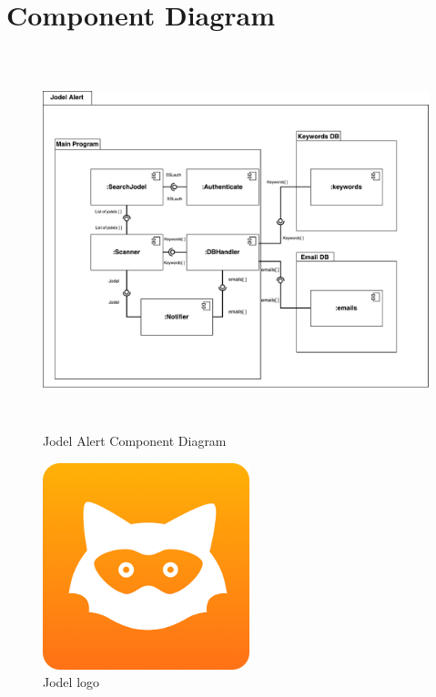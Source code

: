 \documentclass[a4paper,12pt]{article}
\begin{document}
\section{Component Diagram}
\begin{figure}[!h]
	\centering
	\includegraphics[height=11cm]{img/component_diagram.pdf}
	\caption{Jodel Alert Component Diagram}
	\label{Jodel}
\end{figure}
\clearpage

\begin{figure}[!h]
	\centering
	\includegraphics[height=6cm]{img/jodel.png}
	\caption{Jodel logo}
	\label{Jodel}
\end{figure}
\end{document}

